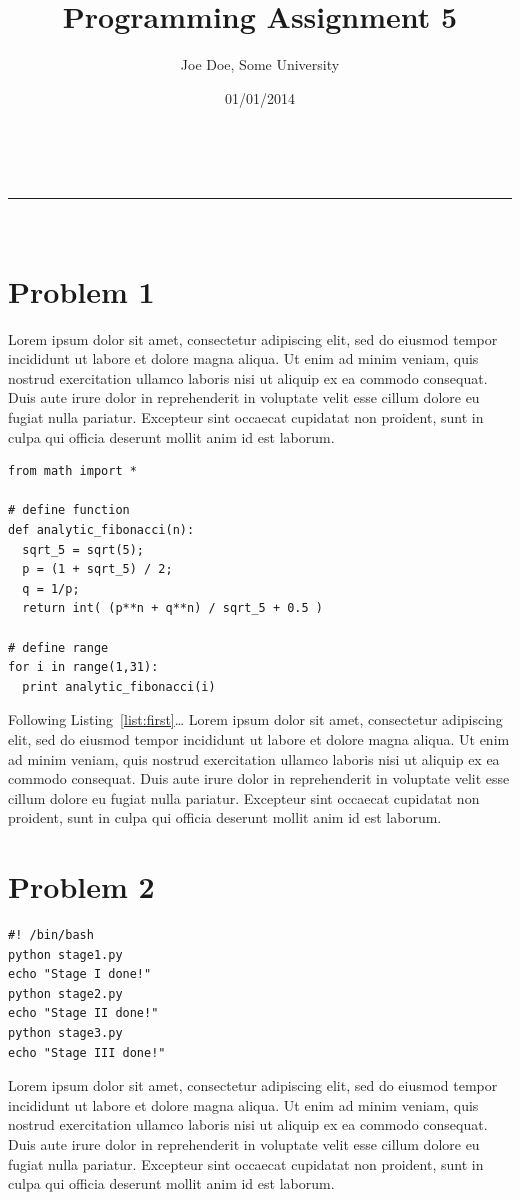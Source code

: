 \documentclass[a4paper,11pt]{article}
\makeatletter
\newcommand{\linia}{\rule{\linewidth}{0.5pt}}
\theoremstyle{mytheor}
\renewcommand{\maketitle}{
\begin{center}
\vspace{2ex}
{\huge \textsc{\@title}}
\vspace{1ex}
\\
\linia\\
\@author \hfill \@date
\vspace{4ex}
\end{center}
}
\makeatother
\begin{document}
\title{Programming Assignment \textnumero{} 5}

\author{Joe Doe, Some University}

\date{01/01/2014}

\maketitle

\section*{Problem 1}

Lorem ipsum dolor sit amet, consectetur adipiscing elit, sed do eiusmod tempor incididunt ut labore et dolore magna aliqua. Ut enim ad minim veniam, quis nostrud exercitation ullamco laboris nisi ut aliquip ex ea commodo consequat. Duis aute irure dolor in reprehenderit in voluptate velit esse cillum dolore eu fugiat nulla pariatur. Excepteur sint occaecat cupidatat non proident, sunt in culpa qui officia deserunt mollit anim id est laborum.

\begin{lstlisting}[label={list:first},caption=Sample Python code -- Fibonacci sequence calculated analytically.]
from math import *

# define function 
def analytic_fibonacci(n):
  sqrt_5 = sqrt(5);
  p = (1 + sqrt_5) / 2;
  q = 1/p;
  return int( (p**n + q**n) / sqrt_5 + 0.5 )
 
# define range
for i in range(1,31):
  print analytic_fibonacci(i)
\end{lstlisting}

Following Listing~\ref{list:first}\ldots{} 
Lorem ipsum dolor sit amet, consectetur adipiscing elit, sed do eiusmod tempor incididunt ut labore et dolore magna aliqua. Ut enim ad minim veniam, quis nostrud exercitation ullamco laboris nisi ut aliquip ex ea commodo consequat. Duis aute irure dolor in reprehenderit in voluptate velit esse cillum dolore eu fugiat nulla pariatur. Excepteur sint occaecat cupidatat non proident, sunt in culpa qui officia deserunt mollit anim id est laborum.

\section*{Problem 2}

\begin{lstlisting}[label={list:second},caption=Sample Bash code.]
#! /bin/bash
python stage1.py
echo "Stage I done!"
python stage2.py
echo "Stage II done!"
python stage3.py
echo "Stage III done!"
\end{lstlisting}

Lorem ipsum dolor sit amet, consectetur adipiscing elit, sed do eiusmod tempor incididunt ut labore et dolore magna aliqua. Ut enim ad minim veniam, quis nostrud exercitation ullamco laboris nisi ut aliquip ex ea commodo consequat. Duis aute irure dolor in reprehenderit in voluptate velit esse cillum dolore eu fugiat nulla pariatur. Excepteur sint occaecat cupidatat non proident, sunt in culpa qui officia deserunt mollit anim id est laborum.
\end{document}
